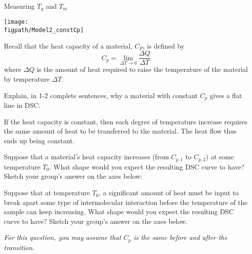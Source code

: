 \begin{activity}{Measuring $T_g$ and $T_m$}
\begin{model}
		\centerline{\texttt{[image: \\figpath/Model2\_constCp]}}
	
\end{model}

\begin{ctqs}

	\question Recall that the heat capacity of a material, $C_P$, is defined by
		\begin{equation*}
			C_p = \lim_{\Delta T\to 0} \frac{\Delta Q}{\Delta T}
		\end{equation*}
		where $\Delta Q$ is the amount of heat required to raise the temperature of the material by temperature $\Delta T$.
		
		Explain, in 1-2 complete sentences, why a material with constant $C_p$ gives a flat line in DSC.
		
			\begin{solution}[1in]
				If the heat capacity is constant, then each degree of temperature increase requires the same amount of heat to be transferred to the material.  The heat flow thus ends up being constant.
			\end{solution}
		
	\question Suppose that a material's heat capacity increases (from $C_{p,1}$ to $C_{p,2}$) at some temperature $T_0$.  What shape would you expect the resulting DSC curve to have?  Sketch your group's answer on the axes below: \label{\labelbase:ctq:CPincrease}
	
		\vspace{6pt}
		\begin{solution}[2in]\end{solution}
		
	\question Suppose that at temperature $T_0$, a significant amount of heat must be input to break apart some type of intermolecular interaction before the temperature of the sample can keep increasing.  What shape would you expect the resulting DSC curve to have?  Sketch your group's answer on the axes below.\label{\labelbase:ctq:delHtrans}
	
		\emph{For this question, you may assume that $C_p$ is the same before and after the transition.}
	
		\vspace{6pt}
		\begin{solution}[2in]\end{solution}
		

\end{ctqs}
\end{activity}
